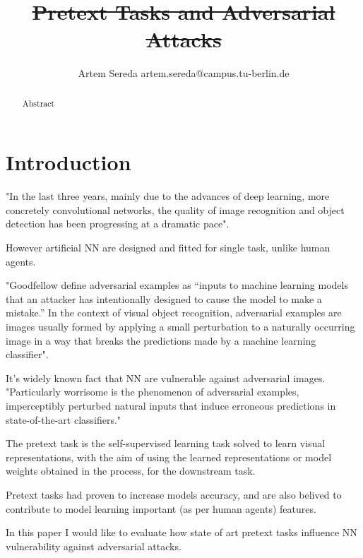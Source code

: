 \documentclass[12pt]{extarticle}
\title{\st{Pretext Tasks and Adversarial Attacks}}
\author{Artem Sereda artem.sereda@campus.tu-berlin.de}
\begin{document}
\maketitle

\begin{abstract}
\normalsize
Abstract
\end{abstract}

\section{Introduction}
\cite{russakovsky2015imagenet} "In the last three years, mainly due to the advances of deep learning, more concretely convolutional
networks, the quality of image recognition and object detection has been progressing at a dramatic pace". \newline

However artificial NN are designed and fitted for single task, unlike human agents. \newline

\cite{DBLP:journals/corr/abs-1802-08195} "Goodfellow define adversarial examples as “inputs to machine learning models that an
attacker has intentionally designed to cause the model to make a mistake.” In the context of visual
object recognition, adversarial examples are images usually formed by applying a small perturbation
to a naturally occurring image in a way that breaks the predictions made by a machine learning
classifier". \newline

It’s widely known fact that NN are vulnerable against adversarial images. \newline
\cite{ilyas2019adversarial} "Particularly worrisome is the phenomenon of adversarial examples, imperceptibly perturbed natural inputs that induce erroneous predictions in state-of-the-art classifiers."\newline

The pretext task is the self-supervised learning task solved to learn visual representations, with the aim of using the learned representations or model weights obtained in the process, for the downstream task. \newline 

\cite{kolesnikov2019revisiting} Pretext tasks had proven to increase models accuracy, and are also belived to contribute to model learning important (as per human agents) features. \newline

In this paper I would like to evaluate how state of art pretext tasks influence NN vulnerability against adversarial attacks. 
  
\end{document}
